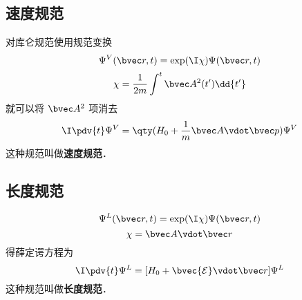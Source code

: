 
\begin{issues}
\issueDraft
\end{issues}


\subsection{速度规范}
 对库仑规范使用规范变换
\begin{equation}\label{LVgaug_eq3}
\Psi^V(\bvec r, t) =  \exp(\I \chi) \Psi(\bvec r, t)
\end{equation}
\begin{equation}\label{LVgaug_eq4}
\chi = \frac{1}{2m} \int^t \bvec A^2(t') \dd{t'}
\end{equation}
就可以将 $\bvec A^2$ 项消去
\begin{equation}
\I \pdv{t} \Psi^V = \qty(H_0 + \frac{1}{m} \bvec A \vdot \bvec p) \Psi^V
\end{equation}
这种规范叫做\textbf{速度规范}．

\subsection{长度规范}

\begin{equation}
\Psi^L(\bvec r, t) =  \exp(\I \chi) \Psi(\bvec r, t)
\end{equation}
\begin{equation}
\chi = \bvec A \vdot \bvec r
\end{equation}
得薛定谔方程为
\begin{equation}
\I \pdv{t} \Psi^L = [H_0 + \bvec{\mathcal{E}} \vdot \bvec r] \Psi^L
\end{equation}
这种规范叫做\textbf{长度规范}．
